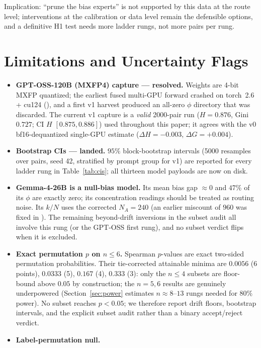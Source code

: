 \documentclass[sigconf]{acmart}
\begin{document}
Implication: ``prune the bias experts'' is not supported by this data at
the route level; interventions at the calibration or data level remain the
defensible options, and a definitive H1 test needs more ladder rungs, not
more pairs per rung.

\section{Limitations and Uncertainty Flags}
\label{sec:limits}
\begin{itemize}
\item \textbf{GPT-OSS-120B (MXFP4) capture --- resolved.}
Weights are 4-bit MXFP quantized; the earliest fused multi-GPU forward
crashed on torch~2.6 + cu124 (), and a
first v1 harvest produced an all-zero $\phi$ directory that was discarded.
The current v1 capture is a \emph{valid} 2000-pair run
($H = 0.876$, Gini $0.727$; CI $H$ $[0.875, 0.886]$) used throughout this
paper; it agrees with the v0 bf16-dequantized single-GPU estimate
($\Delta H = -0.003$, $\Delta G = +0.004$).
\item \textbf{Bootstrap CIs --- landed.}
$95\%$ block-bootstrap intervals (5000 resamples over pairs, seed 42,
stratified by prompt group for v1) are reported for every ladder rung in
Table~\ref{tab:cis}; all thirteen model payloads are now on disk.
\item \textbf{Gemma-4-26B is a null-bias model.}
Its mean bias gap $\approx 0$ and $47\%$ of its
$\phi$ are exactly zero; its concentration readings should be treated as
routing noise. Its $k/N$ uses the corrected $N_A = 240$ (an earlier
miscount of $960$ was fixed in ). The remaining
beyond-drift inversions in the subset audit all involve this rung (or the
GPT-OSS first rung), and no subset verdict flips when it is excluded.
\item \textbf{Exact permutation $p$ on $n \le 6$.}
Spearman $p$-values are exact two-sided permutation
probabilities. Their tie-corrected attainable minima are $0.0056$ (6
points), $0.0333$ (5), $0.167$ (4), $0.333$ (3): only the $n\!\le\!4$
subsets are floor-bound above $0.05$ by construction; the $n=5,6$ results
are genuinely underpowered (Section~\ref{sec:power} estimates
$n\approx8$--$13$ rungs needed for $80\%$ power). No subset reaches
$p < 0.05$; we therefore report drift floors, bootstrap intervals, and the
explicit subset audit rather than a binary accept/reject verdict.
\item \textbf{Label-permutation null.}

\end{itemize}
\end{document}
